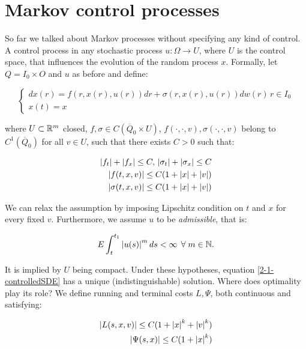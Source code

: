 \section{Markov control processes}

So far we talked about Markov processes without specifying any kind of control. A control process in any 
stochastic process $u:\Omega\rightarrow U$, where $U$ is the control space, that influences the evolution of the random process $x$. 
Formally, let $Q=I_0\times O$ and $u$ as before and define:

\begin{equation}\label{2-1-controlledSDE}
    \begin{cases}
        dx(r) = f(r,x(r),u(r))dr + \sigma(r,x(r),u(r))dw(r)\,r\in I_0 \\
        x(t) = x
    \end{cases}
\end{equation}

where $U\subset\mathbb{R}^m$ closed, $f,\sigma\in C(\overline{Q}_0\times U)$, $f(\cdot,\cdot,v),\sigma(\cdot,\cdot,v)$ belong to $C^1(\overline{Q}_0)$ for all $v\in U$, 
such that there exists $C>0$ such that:

\begin{align}
        \abs{f_t}+\abs{f_x} \leq C,\,\abs{\sigma_t}+\abs{\sigma_x}\leq C \\
        \abs{f(t,x,v)}\leq C(1+\abs{x}+\abs{v}) \\
        \abs{\sigma(t,x,v)}\leq C(1+\abs{x}+\abs{v})
\end{align}


We can relax the assumption by imposing Lipschitz condition on $t$ and $x$ for every fixed $v$. Furthermore,
we assume $u$ to be \textit{admissible}, that is:

\begin{equation}\label{2-1-condoncontrol}
    E\int_t^{t_1} \abs{u(s)}^m\,ds <\infty\,\forall m\in\mathbb{N}.
\end{equation}

It is implied by $U$ being compact. Under these hypotheses, equation \ref{2-1-controlledSDE} has a unique (indistinguishable) solution. 
Where does optimality play its role? We define running and terminal costs $L,\Psi$, both continuous and satisfying:

\begin{align}
    \abs{L(s,x,v)} \leq C(1+\abs{x}^k+\abs{v}^k) \\
    \abs{\Psi(s,x)} \leq C(1+\abs{x}^k)
\end{align}

